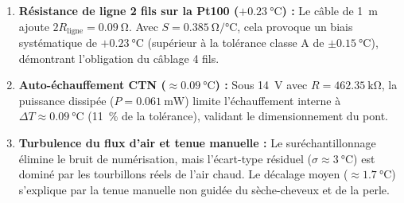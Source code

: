 \begin{enumerate}[leftmargin=1.0cm,topsep=1pt,itemsep=0.5pt,parsep=0pt]
    \item \textbf{Résistance de ligne 2 fils sur la Pt100 ($+\qty{0.23}{\degreeCelsius}$) :} Le câble de \qty{1}{\meter} ajoute $2 R_{\text{ligne}} = \qty{0.09}{\ohm}$. Avec $S = \qty{0.385}{\ohm\per\degreeCelsius}$, cela provoque un biais systématique de $+\qty{0.23}{\degreeCelsius}$ (supérieur à la tolérance classe A de $\pm \qty{0.15}{\degreeCelsius}$), démontrant l'obligation du câblage 4 fils.
    \item \textbf{Auto-échauffement CTN ($\approx \qty{0.09}{\degreeCelsius}$) :} Sous \qty{14}{\volt} avec $R = \qty{462.35}{\kilo\ohm}$, la puissance dissipée ($P = \qty{0.061}{\milli\watt}$) limite l'échauffement interne à $\Delta T \approx \qty{0.09}{\degreeCelsius}$ (\qty{11}{\percent} de la tolérance), validant le dimensionnement du pont.
    \item \textbf{Turbulence du flux d'air et tenue manuelle :} Le suréchantillonnage élimine le bruit de numérisation, mais l'écart-type résiduel ($\sigma \approx \qty{3}{\degreeCelsius}$) est dominé par les tourbillons réels de l'air chaud. Le décalage moyen ($\approx \qty{1.7}{\degreeCelsius}$) s'explique par la tenue manuelle non guidée du sèche-cheveux et de la perle.
\end{enumerate}
